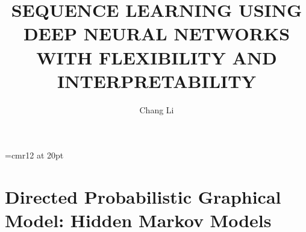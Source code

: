 \documentclass{StyFiles/usydthesis}
\renewcommand{\thepage}{\roman{page}}
\begin{document}
\singlespacing
{}  %
\renewcommand{\thepage}{\roman{page}}	
\font\myfont=cmr12 at 20pt 
\title{{\myfont\bf SEQUENCE LEARNING USING DEEP NEURAL NETWORKS WITH FLEXIBILITY AND INTERPRETABILITY}}
\author{Chang Li}
\def\thisauthor{Chang Li}
\def\degree{Doctor of Philosophy}
\def\department{School of Computer Science \\ Faculty of Engineering}
\def\mydegrees{Doctor of Philosophy (Ph.D.)}
\def\supervisor{Dacheng Tao}
\def\assocsupervisora{Dongjin Song}

\onehalfspacing
% 

% 

% 

% 

\cleardoublepage
\pagestyle{headings}
\tableofcontents
\listoffigures
\listoftables

\setcounter{page}{1}  %



\mainmatter


\part{Directed Probabilistic Graphical Model: Hidden Markov
  Models}
\label{part:1}


\end{document}
